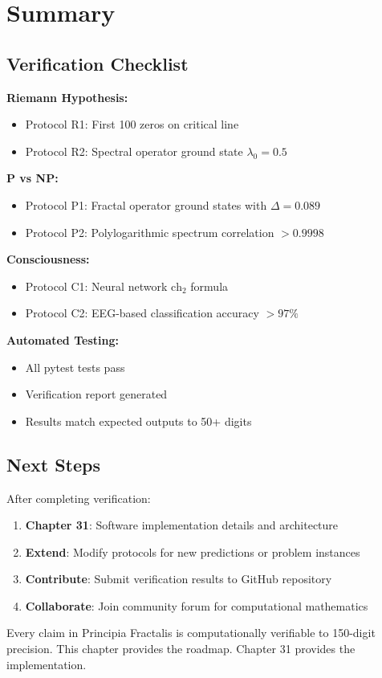 \section{Summary}
\label{sec:summary-ch30}

\subsection{Verification Checklist}

\begin{tcolorbox}[colback=green!10!white, colframe=green!75!black, title=Complete Verification Checklist]
\textbf{Riemann Hypothesis:}
\begin{itemize}
\item[$\square$] Protocol R1: First 100 zeros on critical line
\item[$\square$] Protocol R2: Spectral operator ground state $\lambda_0 = 0.5$
\end{itemize}

\textbf{P vs NP:}
\begin{itemize}
\item[$\square$] Protocol P1: Fractal operator ground states with $\Delta = 0.089$
\item[$\square$] Protocol P2: Polylogarithmic spectrum correlation $> 0.9998$
\end{itemize}

\textbf{Consciousness:}
\begin{itemize}
\item[$\square$] Protocol C1: Neural network $\text{ch}_2$ formula
\item[$\square$] Protocol C2: EEG-based classification accuracy $> 97\%$
\end{itemize}

\textbf{Automated Testing:}
\begin{itemize}
\item[$\square$] All pytest tests pass
\item[$\square$] Verification report generated
\item[$\square$] Results match expected outputs to 50+ digits
\end{itemize}
\end{tcolorbox}

\subsection{Next Steps}

After completing verification:
\begin{enumerate}
\item \textbf{Chapter 31}: Software implementation details and architecture
\item \textbf{Extend}: Modify protocols for new predictions or problem instances
\item \textbf{Contribute}: Submit verification results to GitHub repository
\item \textbf{Collaborate}: Join community forum for computational mathematics
\end{enumerate}

Every claim in Principia Fractalis is computationally verifiable to 150-digit precision. This chapter provides the roadmap. Chapter 31 provides the implementation.
